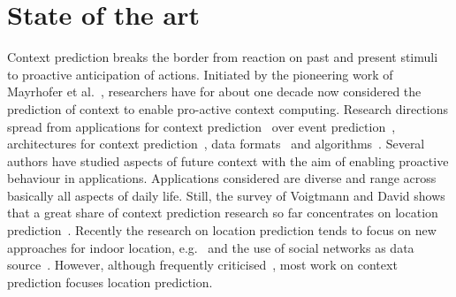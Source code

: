 \section{State of the art}
\label{sec:stateOfTheArt}

Context prediction breaks the border from reaction on past and present stimuli to proactive anticipation of actions. 
Initiated by the pioneering work of Mayrhofer et al.~\cite{5013}, researchers have for about one decade now considered the prediction of context to enable pro-active context computing. 
Research directions spread from applications for context prediction~\cite{5035} over event prediction~\cite{5071}, architectures for context prediction~\cite{5001,5010,4027}, data formats~\cite{Prediction_Bannach_2010} and algorithms~\cite{Prediction_Intille_2006}. 
Several authors have studied aspects of future context with the aim of enabling proactive behaviour in applications. 
Applications considered are diverse and range across basically all aspects of daily life. 
Still, the survey of Voigtmann and David shows that a great share of context prediction research so far concentrates on location prediction~\cite{Prediction_Voigtmann_2012}. 
Recently the research on location prediction tends to focus on new approaches for indoor location, e.g.~\cite{Prediction_Ruscher_2012,Prediction_Murao_2012} and the use of social networks as data source~\cite{Prediction_Zhang_2012}. 
However, although frequently criticised~\cite{5088}, most work on context prediction focuses location prediction.

